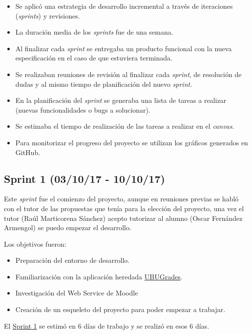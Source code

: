 \begin{itemize}
	\tightlist
	\item
	Se aplicó una estrategia de desarrollo incremental a través de
	iteraciones (\emph{sprints}) y revisiones.
	\item
	La duración media de los \emph{sprints} fue de una semana.
	\item
	Al finalizar cada \emph{sprint} se entregaba un producto funcional con la nueva especificación en el caso de que estuviera terminada.
	\item
	Se realizaban reuniones de revisión al finalizar cada \emph{sprint}, de resolución de dudas y
	al mismo tiempo de planificación del nuevo \emph{sprint}.
	\item
	En la planificación del \emph{sprint} se generaba una lista de tareas a realizar (nuevas funcionalidades o bugs a solucionar).
	\item
	Se estimaba el tiempo de realización de las tareas a realizar en el \emph{canvas}.
	\item
	Para monitorizar el progreso del proyecto se utilizan los gráficos generados en GitHub.
	
\end{itemize}

\subsection{Sprint 1 (03/10/17 -
	10/10/17)}\label{sprint-1-0031017---101017}
Este \emph{sprint} fue el comienzo del proyecto, aunque en reuniones previas se habló con el tutor de las propuestas que tenía para la elección del proyecto, una vez el tutor (Raúl Marticorena Sánchez) acepto tutorizar al alumno (Oscar Fernández Armengol) se puedo empezar el desarrollo.

Los objetivos fueron:
\begin{itemize}
	\tightlist
	\item
	Preparación del entorno de desarrollo.
	\item
	Familiarización con la aplicación heredada \href{https://github.com/claumartinezh/TFG_UBUGrades}{UBUGrades}.
	\item
	Investigación del Web Service de Moodle
	\item
	Creación de un esqueleto del proyecto para poder empezar a trabajar.
	
\end{itemize}
El \href{https://github.com/trona85/GII-17.1B-UBULog-1.0/milestone/1?closed=1}{Sprint 1} se estimó en 6 días de trabajo y se realizó en esos 6 días.

